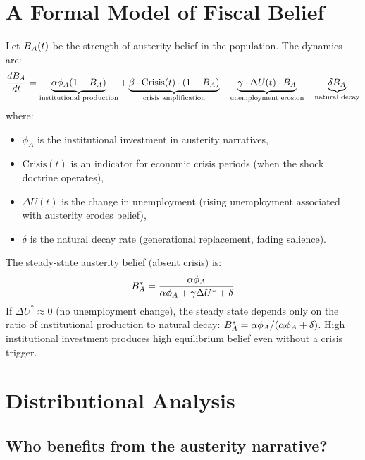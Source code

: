 \section{A Formal Model of Fiscal Belief}
\label{sec:ch25-model}

\begin{model}
\label{mod:austerity-dynamics}
Let $B_{A}(t)$ be the strength of austerity belief in the population.
The dynamics are:
\[
  \frac{dB_{A}}{dt} = \underbrace{\alpha \phi_A (1 - B_{A})}_{\text{institutional production}} + \underbrace{\beta \cdot \text{Crisis}(t) \cdot (1 - B_{A})}_{\text{crisis amplification}} - \underbrace{\gamma \cdot \Delta U(t) \cdot B_{A}}_{\text{unemployment erosion}} - \underbrace{\delta B_{A}}_{\text{natural decay}}
\]
where:
\begin{itemize}[nosep]
  \item $\phi_A$ is the institutional investment in austerity narratives,
  \item $\text{Crisis}(t)$ is an indicator for economic crisis periods (when the shock doctrine operates),
  \item $\Delta U(t)$ is the change in unemployment (rising unemployment associated with austerity erodes belief),
  \item $\delta$ is the natural decay rate (generational replacement, fading salience).
\end{itemize}
\end{model}

\begin{proposition}
\label{prop:austerity-persistence}
The steady-state austerity belief (absent crisis) is:
\[
  B_{A}^* = \frac{\alpha \phi_A}{\alpha \phi_A + \gamma \Delta U^* + \delta}
\]
If $\Delta U^* \approx 0$ (no unemployment change), the steady state depends only on the ratio of institutional production to natural decay: $B_{A}^* = \alpha \phi_A / (\alpha \phi_A + \delta)$.
High institutional investment produces high equilibrium belief even without a crisis trigger.
\end{proposition}

\section{Distributional Analysis}
\label{sec:ch25-distributional}

\subsection{Who benefits from the austerity narrative?}

